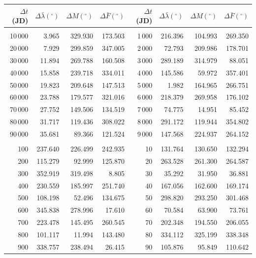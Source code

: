 \clearpage
\begin{table}[!h]
\vspace{0.25cm}
\centering
\begin{tabular}{rrrr|rrrr}
$\Delta t$(JD)& $\Delta\bar{\lambda}(^\circ)$ &  $\Delta M(^\circ)$ & $\Delta \bar{F}(^\circ)$& $\Delta t$(JD) & $\Delta\bar{\lambda}(^\circ)$ & $\Delta M(^\circ)$ 
&$\Delta \bar{F}(^\circ)$\\ \hline
&&&&&&&\\[-1.75ex]
10\,000 &   3.965 & 329.930 & 173.503 & 1\,000 & 216.396 & 104.993 & 269.350\\
20\,000 &   7.929 & 299.859 & 347.005 & 2\,000 &  72.793 & 209.986 & 178.701\\
30\,000 &  11.894 & 269.788 & 160.508 & 3\,000 & 289.189 & 314.979 &  88.051\\
40\,000 &  15.858 & 239.718 & 334.011 & 4\,000 & 145.586 &  59.972 & 357.401\\
50\,000 &  19.823 & 209.648 & 147.513 & 5\,000 &   1.982 & 164.965 & 266.751\\
60\,000 &  23.788 & 179.577 & 321.016 & 6\,000 & 218.379 & 269.958 & 176.102\\
70\,000 &  27.752 & 149.506 & 134.519 & 7\,000 &  74.775 &  14.951 &  85.452\\
80\,000 &  31.717 & 119.436 & 308.022 & 8\,000 & 291.172 & 119.944 & 354.802\\
90\,000 &  35.681 &  89.366 & 121.524 & 9\,000 & 147.568 & 224.937 & 264.152\\
&&&&&&&\\
100 & 237.640 & 226.499 & 242.935 & 10 & 131.764 & 130.650 & 132.294\\
200 & 115.279 &  92.999 & 125.870 & 20 & 263.528 & 261.300 & 264.587\\
300 & 352.919 & 319.498 &   8.805 & 30 &  35.292 &  31.950 &  36.881\\
400 & 230.559 & 185.997 & 251.740 & 40 & 167.056 & 162.600 & 169.174\\
500 & 108.198 &  52.496 & 134.675 & 50 & 298.820 & 293.250 & 301.468\\
600 & 345.838 & 278.996 &  17.610 & 60 &  70.584 &  63.900 &  73.761\\
700 & 223.478 & 145.495 & 260.545 & 70 & 202.348 & 194.550 & 206.055\\
800 & 101.117 &  11.994 & 143.480 & 80 & 334.112 & 325.199 & 338.348\\
900 & 338.757 & 238.494 &  26.415 & 90 & 105.876 &  95.849 & 110.642\\

\end{tabular}
\end{table}
